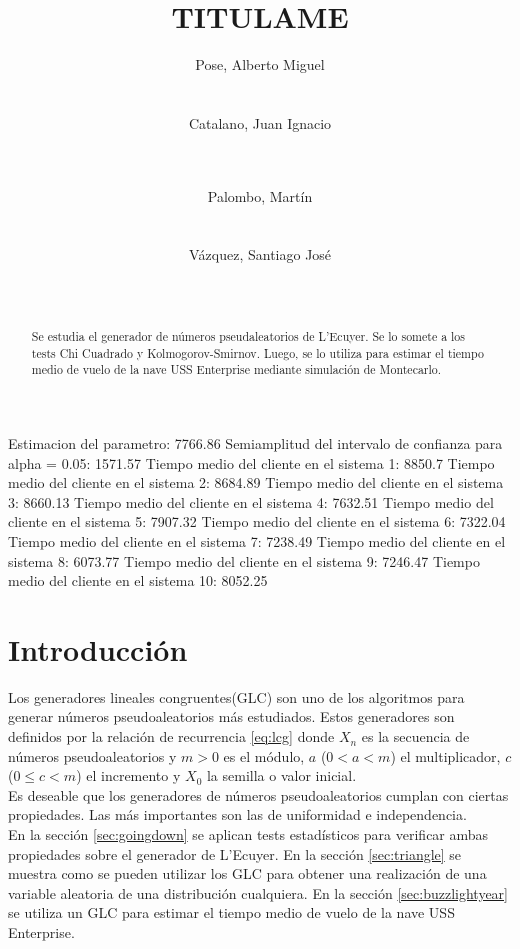 \documentclass{sig-alternate}
\title{TITULAME}
\author{
\alignauthor
Pose, Alberto Miguel\\
       \affaddr{Instituto Tecnol\'ogico de Buenos Aires}\\
       \affaddr{Buenos Aires, Argentina}\\
       \email{apose@alu.itba.edu.ar}
\alignauthor
Catalano, Juan Ignacio\\
       \affaddr{Instituto Tecnol\'ogico de Buenos Aires}\\
       \affaddr{Buenos Aires, Argentina}\\
       \email{jcatalan@alu.itba.edu.ar}
\and
\alignauthor 
Palombo, Mart\'in\\
       \affaddr{Instituto Tecnol\'ogico de Buenos Aires}\\
       \affaddr{Buenos Aires, Argentina}\\
       \email{mpalombo@alu.itba.edu.ar}
\alignauthor 
V\'azquez, Santiago Jos\'e\\
       \affaddr{Instituto Tecnol\'ogico de Buenos Aires}\\
       \affaddr{Buenos Aires, Argentina}\\
       \email{savazque@alu.itba.edu.ar}
}
\date{}
\begin{document}
Estimacion del parametro: 7766.86
Semiamplitud del intervalo de confianza para alpha = 0.05: 1571.57
Tiempo medio del cliente en el sistema 1: 8850.7
Tiempo medio del cliente en el sistema 2: 8684.89
Tiempo medio del cliente en el sistema 3: 8660.13
Tiempo medio del cliente en el sistema 4: 7632.51
Tiempo medio del cliente en el sistema 5: 7907.32
Tiempo medio del cliente en el sistema 6: 7322.04
Tiempo medio del cliente en el sistema 7: 7238.49
Tiempo medio del cliente en el sistema 8: 6073.77
Tiempo medio del cliente en el sistema 9: 7246.47
Tiempo medio del cliente en el sistema 10: 8052.25

\maketitle

\begin{abstract}
Se estudia el generador de n\'umeros pseudaleatorios de L'Ecuyer.
Se lo somete a los tests Chi Cuadrado y Kolmogorov-Smirnov.
Luego, se lo utiliza para estimar el tiempo medio de vuelo de
la nave USS Enterprise mediante simulaci\'on de Montecarlo.
\end{abstract} 

\newpage

\section{Introducci\'on}
Los generadores lineales congruentes(GLC) son uno de los algoritmos
para generar n\'umeros pseudoaleatorios m\'as estudiados.
Estos generadores son definidos por la relaci\'on de recurrencia
\eqref{eq:lcg} donde $X_n$ es la secuencia de n\'umeros pseudoaleatorios y
 $m > 0$ es el m\'odulo, $a$ ($ 0 < a < m$) el multiplicador, $c$ ($0 \leq c < m$)
el incremento y $X_0$ la semilla o valor inicial. \\

Es deseable que los generadores de n\'umeros pseudoaleatorios cumplan
con ciertas propiedades. Las m\'as importantes son las de uniformidad
e independencia. \\

En la secci\'on \ref{sec:goingdown} se aplican tests estad\'isticos para
verificar ambas propiedades sobre el generador de L'Ecuyer. En la secci\'on
\ref{sec:triangle} se muestra como se pueden utilizar los GLC para obtener
una realizaci\'on de una variable aleatoria de una distribuci\'on cualquiera.
En la secci\'on \ref{sec:buzzlightyear} se utiliza un GLC para estimar el
tiempo medio de vuelo de la nave USS Enterprise.
\end{document}
